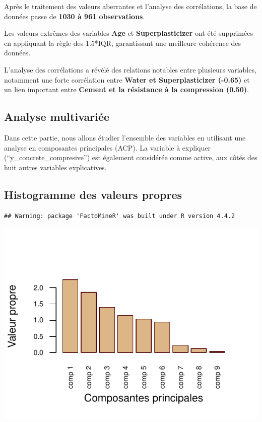 \documentclass[
  12pt,
]{article}
\begin{document}
Après le traitement des valeurs aberrantes et l'analyse des
corrélations, la base de données passe de \textbf{1030 à 961
observations}.

Les valeurs extrêmes des variables \textbf{Age} et
\textbf{Superplasticizer} ont été supprimées en appliquant la règle des
1.5*IQR, garantissant une meilleure cohérence des données.

L'analyse des corrélations a révélé des relations notables entre
plusieurs variables, notamment une forte corrélation entre \textbf{Water
et Superplasticizer (-0.65)} et un lien important entre \textbf{Cement
et la résistance à la compression (0.50)}.

\subsection{Analyse multivariée}\label{analyse-multivariuxe9e}

Dans cette partie, nous allons étudier l'ensemble des variables en
utilisant une analyse en composantes principales (ACP). La variable à
expliquer (``y\_concrete\_compresive'') est également considérée comme
active, aux côtés des huit autres variables explicatives.

\subsection{Histogramme des valeurs
propres}\label{histogramme-des-valeurs-propres}

\begin{verbatim}
## Warning: package 'FactoMineR' was built under R version 4.4.2
\end{verbatim}

\begin{center}\includegraphics{rmd_final_files/figure-latex/unnamed-chunk-30-1} \end{center}
\end{document}
